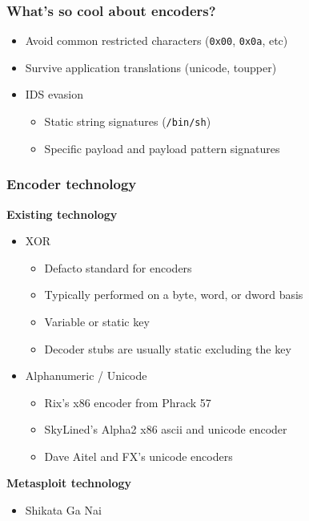 \documentclass{beamer}
\newenvironment{sitemize}{\vspace{1mm}\begin{itemize}\itemsep 4pt\small}{\end{itemize}}
\begin{document}
\begin{frame}[t]
    \frametitle{What's so cool about encoders?}

    \begin{sitemize}
        \item Avoid common restricted characters
            (\texttt{0x00}, \texttt{0x0a}, etc)
    \item Survive application translations (unicode, toupper)

        \pause
        \item IDS evasion
        \begin{sitemize}
            \item Static string signatures
            (\texttt{/bin/sh})
            \item Specific payload and payload pattern signatures
        \end{sitemize}
    \end{sitemize}
\end{frame}

\begin{frame}[t]
    \frametitle{Encoder technology}

    \textbf{Existing technology}
    \begin{sitemize}
        \item XOR
        \begin{sitemize}
            \item Defacto standard for encoders
            \item Typically performed on a byte, word, or dword basis
            \item Variable or static key
            \item Decoder stubs are usually static excluding the key
        \end{sitemize}

        \pause
        \item Alphanumeric / Unicode
        \begin{sitemize}
            \item Rix's x86 encoder from Phrack 57
            \item SkyLined's Alpha2 x86 ascii and unicode encoder
        \item Dave Aitel and FX's unicode encoders
        \end{sitemize}
    \end{sitemize}
     \textbf{Metasploit technology}
     \begin{sitemize}
         \item Shikata Ga Nai
     \end{sitemize}
\end{frame}
\end{document}

